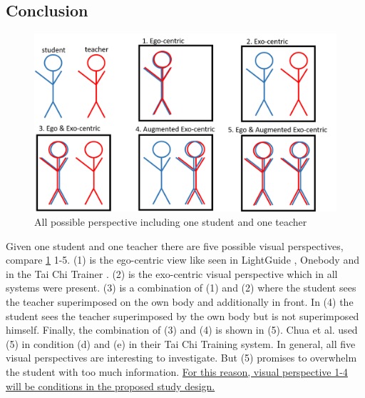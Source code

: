 \subsection{Conclusion}
\begin{figure}
	\centering
	\includegraphics[width=1.0\textwidth]{img/perspectives.png}
	\caption{All possible perspective including one student and one teacher}
	\label{fig:perspectives}
\end{figure}
Given one student and one teacher there are five possible visual perspectives, compare \ref{fig:perspectives} 1-5. (1) is the ego-centric view like seen in LightGuide \cite{Sodhi2012}, Onebody \cite{Hoang2016} and in the Tai Chi Trainer \cite{Chua2003}. (2) is the exo-centric visual perspective which in all systems were present. (3) is a combination of (1) and (2) where the student sees the teacher superimposed on the own body and additionally in front. In (4) the student sees the teacher superimposed by the own body but is not superimposed himself. Finally, the combination of (3) and (4) is shown in (5). Chua et al. used (5) in condition (d) and (e) in their Tai Chi Training system. In general, all five visual perspectives are interesting to investigate. But (5) promises to overwhelm the student with too much information. \ul{For this reason, visual perspective 1-4 will be conditions in the proposed study design.}\\
